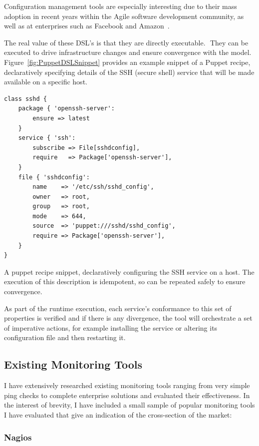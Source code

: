 \documentclass{cshonours}
\begin{document}
Configuration management tools are especially interesting due to their mass adoption in recent years within the Agile software development community, as well as at enterprises such as Facebook and Amazon~\cite{Chef}.

The real value of these DSL's is that they are directly executable.  They can be executed to drive infrastructure changes and ensure convergence with the model. Figure~\ref{fig:PuppetDSLSnippet} provides an example snippet of a Puppet recipe, declaratively specifying details of the SSH (secure shell) service that will be made available on a specific host.

\begin{listing}[h]
\begin{verbatim}
class sshd {
    package { 'openssh-server':
        ensure => latest
    }
    service { 'ssh':
        subscribe => File[sshdconfig],
        require   => Package['openssh-server'],
    }
    file { 'sshdconfig': 
        name    => '/etc/ssh/sshd_config',
        owner   => root,
        group   => root,
        mode    => 644,
        source  => 'puppet:///sshd/sshd_config',
        require => Package['openssh-server'],
    }
}
\end{verbatim}
\caption{A puppet recipe snippet, declaratively configuring the SSH service on a host. The execution of this description is idempotent, so can be repeated safely to ensure convergence.}
\label{fig:PuppetDSLSnippet}
\end{listing}

As part of the runtime execution, each service’s conformance to this set of properties is verified and if there is any divergence, the tool will orchestrate a set of imperative actions, for example installing the service or altering its configuration file and then restarting it.

\clearpage
\subsection{Existing Monitoring Tools}

I have extensively researched existing monitoring tools ranging from very simple ping checks to complete enterprise solutions and evaluated their effectiveness. In the interest of brevity, I have included a small sample of popular monitoring tools I have evaluated that give an indication of the cross-section of the market:

\subsubsection{Nagios}
\end{document}
